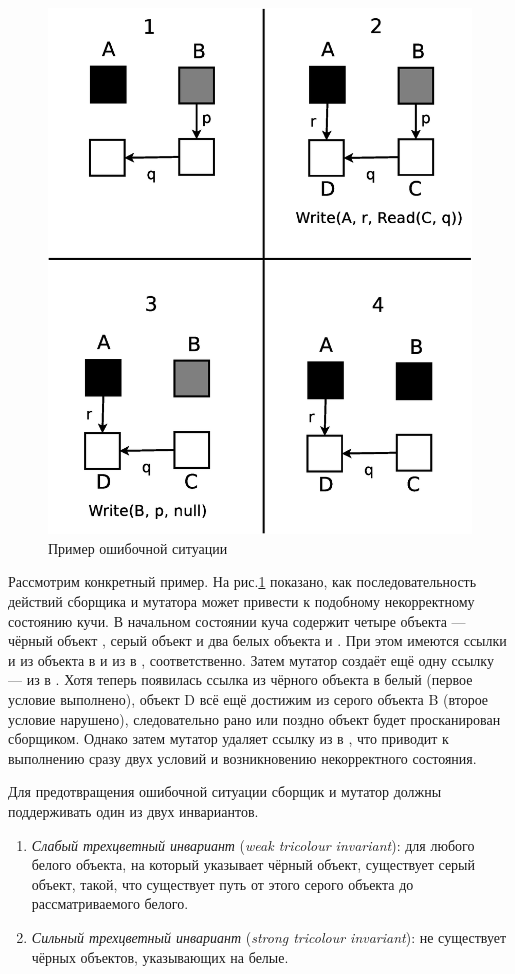 \begin{figure}[h!]
\centering
\includegraphics[width=0.4\linewidth]{Moiseenko/images/inc_marking.eps}
\caption{Пример ошибочной ситуации}
\label{fig:inc_marking}
\end{figure}

Рассмотрим конкретный пример. На рис.\ref{fig:inc_marking} показано, как последовательность 
действий сборщика и мутатора может привести к подобному некорректному состоянию кучи. 
В начальном состоянии куча содержит четыре объекта --- чёрный объект , 
серый объект  и два белых объекта  и .
При этом имеются ссылки  и  из объекта  в  и из 
 в , соответственно. 
Затем мутатор создаёт ещё одну ссылку  --- из  в . 
Хотя теперь появилась ссылка из чёрного объекта в белый (первое условие выполнено), 
объект D всё ещё достижим из серого объекта B (второе условие нарушено), следовательно 
рано или поздно объект  будет просканирован сборщиком. 
Однако затем мутатор удаляет ссылку из  в , что приводит к выполнению 
сразу двух условий и возникновению некорректного состояния.

Для предотвращения ошибочной ситуации сборщик и мутатор должны поддерживать один из двух 
инвариантов.

\begin{enumerate}
\item 
	\emph{Слабый трехцветный инвариант} (\emph{weak tricolour invariant}): для любого 
	белого объекта, на который указывает чёрный объект, существует серый объект, такой, 
	что существует путь от этого серого объекта до рассматриваемого белого.
\item 
	\emph{Сильный трехцветный инвариант} (\emph{strong tricolour invariant}): не существует 
	чёрных объектов, указывающих на белые.
\end{enumerate}

